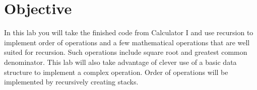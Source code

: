 \section{Objective}

In this lab you will take the finished code from Calculator I and use recursion to implement order of operations and a few mathematical operations that are well suited for recursion.  Such operations include square root and greatest common denominator.  This lab will also take advantage of clever use of a basic data structure to implement a complex operation.  Order of operations will be implemented by recursively creating stacks.